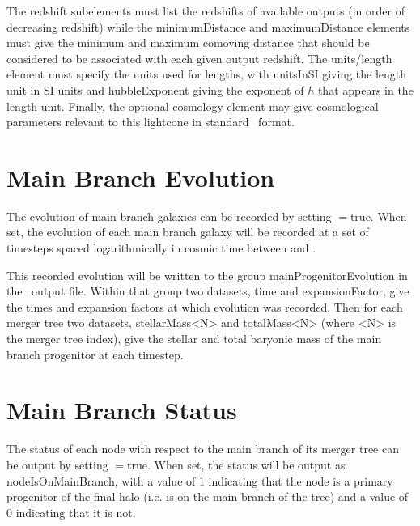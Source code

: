  The {\normalfont \ttfamily redshift} subelements must list the redshifts of available outputs (in order of decreasing redshift) while the {\normalfont \ttfamily minimumDistance} and {\normalfont \ttfamily maximumDistance} elements must give the minimum and maximum comoving distance that should be considered to be associated with each given output redshift. The {\normalfont \ttfamily units/length} element must specify the units used for lengths, with {\normalfont \ttfamily unitsInSI} giving the length unit in SI units and {\normalfont \ttfamily hubbleExponent} giving the exponent of $h$ that appears in the length unit. Finally, the optional {\normalfont \ttfamily cosmology} element may give cosmological parameters relevant to this lightcone in standard \glc\ format.

\section{Main Branch Evolution}

The evolution of main branch galaxies can be recorded by setting {\normalfont \ttfamily [timestepRecordEvolution]}$=${\normalfont \ttfamily true}. When set, the evolution of each main branch galaxy will be recorded at a set of {\normalfont \ttfamily [timestepRecordEvolutionSteps]} timesteps spaced logarithmically in cosmic time between {\normalfont \ttfamily [timestepRecordEvolutionBegin]} and \newline {\normalfont \ttfamily [timestepRecordEvolutionEnd]}. 

This recorded evolution will be written to the group {\normalfont \ttfamily mainProgenitorEvolution} in the \glc\ output file. Within that group two datasets, {\normalfont \ttfamily time} and {\normalfont \ttfamily expansionFactor}, give the times and expansion factors at which evolution was recorded. Then for each merger tree two datasets, {\normalfont \ttfamily stellarMass<N>} and {\normalfont \ttfamily totalMass<N>} (where {\normalfont \ttfamily <N>} is the merger tree index), give the stellar and total baryonic mass of the main branch progenitor at each timestep.

\section{Main Branch Status}

The status of each node with respect to the main branch of its merger tree can be output by setting {\normalfont \ttfamily [outputMainBranchStatus]}$=${\normalfont \ttfamily true}. When set, the status will be output as {\normalfont \ttfamily nodeIsOnMainBranch}, with a value of 1 indicating that the node is a primary progenitor of the final halo (i.e. is on the main branch of the tree) and a value of 0 indicating that it is not.

